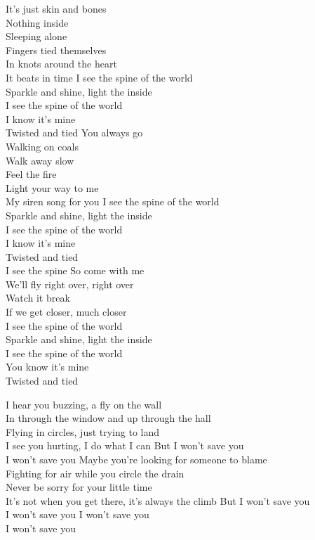 
It's just skin and bones\\
Nothing inside\\
Sleeping alone\\
Fingers tied themselves\\
In knots around the heart\\
It beats in time
\hops
I see the spine of the world\\
Sparkle and shine, light the inside\\
I see the spine of the world\\
I know it's mine\\
Twisted and tied
\hops
You always go\\
Walking on coals\\
Walk away slow\\
Feel the fire\\
Light your way to me\\
My siren song for you
\hops
I see the spine of the world\\
Sparkle and shine, light the inside\\
I see the spine of the world\\
I know it's mine\\
Twisted and tied\\
I see the spine
\hops
So come with me\\
We'll fly right over, right over\\
Watch it break\\
If we get closer, much closer\\
\hops
I see the spine of the world\\
Sparkle and shine, light the inside\\
I see the spine of the world\\
You know it's mine\\
Twisted and tied

\clearpage
{}

I hear you buzzing, a fly on the wall \tab{}\\
In through the window and up through the hall \\
Flying in circles, just trying to land\tab{}\\
I see you hurting, I do what I can \tab{}
\hops
But I won't save you\tab{}\\
I won't save you \tab{}
\hops
Maybe you're looking for someone to blame\\
Fighting for air while you circle the drain\\
Never be sorry for your little time\\
It's not when you get there, it's always the climb
\hops
But I won't save you\\
I won't save you
\hops
I won't save you\\
I won't save you

